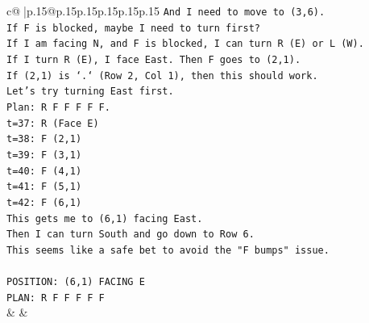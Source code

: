 \documentclass{article}
\begin{document}
{\begin{supertabular}{c@{$\;$}|p{.15\linewidth}@{}p{.15\linewidth}p{.15\linewidth}p{.15\linewidth}p{.15\linewidth}p{.15\linewidth}}
{{{\texttt{And I need to move to (3,6).} \\
\texttt{If F is blocked, maybe I need to turn first?} \\
\texttt{If I am facing N, and F is blocked, I can turn R (E) or L (W).} \\
\texttt{If I turn R (E), I face East. Then F goes to (2,1).} \\
\texttt{If (2,1) is `.` (Row 2, Col 1), then this should work.} \\
\texttt{Let's try turning East first.} \\
\texttt{Plan: R F F F F F.} \\
\texttt{t=37: R (Face E)} \\
\texttt{t=38: F (2,1)} \\
\texttt{t=39: F (3,1)} \\
\texttt{t=40: F (4,1)} \\
\texttt{t=41: F (5,1)} \\
\texttt{t=42: F (6,1)} \\
\texttt{This gets me to (6,1) facing East.} \\
\texttt{Then I can turn South and go down to Row 6.} \\
\texttt{This seems like a safe bet to avoid the "F bumps" issue.} \\
\\ 
\texttt{POSITION: (6,1) FACING E} \\
\texttt{PLAN: R F F F F F} \\
            }
        }
    }
    & & \\ \\


\end{supertabular}}
\end{document}
